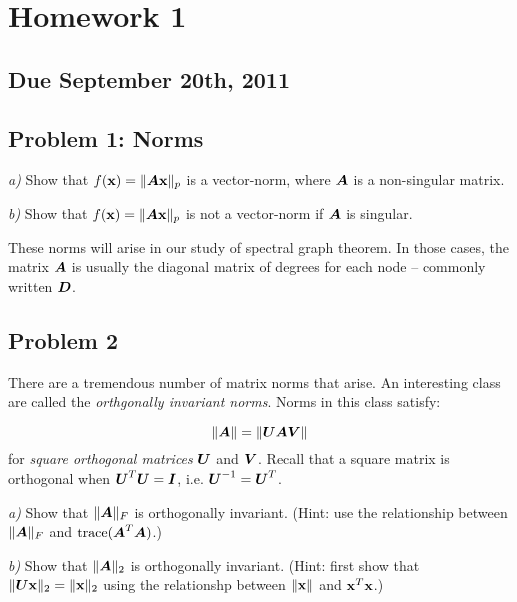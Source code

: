 \documentclass{article}
\begin{document}
 
\hypertarget{homework_1_1}{}\section*{{Homework 1}}\label{homework_1_1}

\hypertarget{due_september_20th_2011_2}{}\subsection*{{Due September 20th, 2011}}\label{due_september_20th_2011_2}

\hypertarget{problem_1_norms_3}{}\subsection*{{Problem 1: Norms}}\label{problem_1_norms_3}

\emph{a)} Show that $f(\boldsymbol{\mathrm{x}}) = \|\boldsymbol{A} \boldsymbol{\mathrm{x}}\|_p$ is a vector-norm, where $\boldsymbol{A}$ is a non-singular matrix.

\emph{b)} Show that $f(\boldsymbol{\mathrm{x}}) = \|\boldsymbol{A} \boldsymbol{\mathrm{x}}\|_p$ is not a vector-norm if $\boldsymbol{A}$ is singular.

These norms will arise in our study of spectral graph theorem. In those cases, the matrix $\boldsymbol{A}$ is usually the diagonal matrix of degrees for each node --{} commonly written $\boldsymbol{D}$.

\hypertarget{problem_2_4}{}\subsection*{{Problem 2}}\label{problem_2_4}

There are a tremendous number of matrix norms that arise. An interesting class are called the \emph{orthgonally invariant norms}. Norms in this class satisfy:

\begin{displaymath}
\|\boldsymbol{A}\| = \|\boldsymbol{U} \boldsymbol{A} \boldsymbol{V}\|
\end{displaymath}
for \emph{square orthogonal matrices} $\boldsymbol{U}$ and $\boldsymbol{V}$. Recall that a square matrix is orthogonal when $\boldsymbol{U}^T \boldsymbol{U} = \boldsymbol{I}$, i.e. $\boldsymbol{U}^{-1} = \boldsymbol{U}^T$.

\emph{a)} Show that $\| \boldsymbol{A} \|_F$ is orthogonally invariant. (Hint: use the relationship between $\| \boldsymbol{A} \|_F$ and $\text{trace}( \boldsymbol{A}^T \boldsymbol{A} )$.)

\emph{b)} Show that $\| \boldsymbol{A} \|_2$ is orthogonally invariant. (Hint: first show that $\| \boldsymbol{U} \boldsymbol{\mathrm{x}} \|_2 = \|\boldsymbol{\mathrm{x}}\|_2$ using the relationshp between $\| \boldsymbol{\mathrm{x}} \|$ and $\boldsymbol{\mathrm{x}}^T \boldsymbol{\mathrm{x}}$.)
\end{document}
